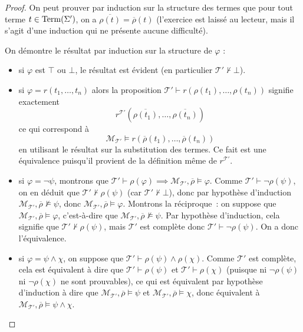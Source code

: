 \begin{proof}
  On peut prouver par induction sur la structure des termes que pour tout terme
  $t \in \operatorname{Term}(\Sigma')$, on a $\overline{\rho(t)} = \overline \rho(t)$
  (l'exercice est laissé au lecteur, mais il s'agit d'une induction qui ne
  présente aucune difficulté).
  
  On démontre le résultat par induction sur la structure de $\varphi$ :
  \begin{itemize}
  \item si $\varphi$ est $\top$ ou $\bot$, le résultat est évident (en
    particulier $\mathcal T'\nvdash\bot$).
  \item si $\varphi = r(t_1,\ldots,t_n)$ alors la proposition
    $\mathcal T'\vdash r(\rho(t_1),\ldots,\rho(t_n))$ signifie exactement
    \[r^{\mathcal T'}(\overline{\rho(t_1)},\ldots,\overline{\rho(t_n)})\]
    ce qui correspond à
    \[\mathcal M_{\mathcal T'}\models 
    r(\overline \rho (t_1),\ldots,\overline \rho(t_n))\]
    en utilisant le résultat sur la substitution des termes.
    Ce fait est une équivalence puisqu'il provient de la définition même de
    $r^{\mathcal T'}$.
  \item si $\varphi = \lnot \psi$, montrons que
    $\mathcal T'\vdash\rho(\varphi)\implies \mathcal M_{\mathcal T'},
    \overline\rho \models \varphi$.
    Comme $\mathcal T'\vdash \lnot \rho(\psi)$, on en déduit que
    $\mathcal T'\nvdash \rho(\psi)$ (car $\mathcal T'\nvdash\bot$), donc par
    hypothèse d'induction
    $\mathcal M_{\mathcal T'},\overline \rho\not\models \psi$, donc
    $\mathcal M_{\mathcal T'},\overline \rho\models \varphi$.
    Montrons la réciproque~: on suppose que
    $\mathcal M_{\mathcal T'},\overline\rho\models \varphi$, c'est-à-dire que
    $\mathcal M_{\mathcal T'},\overline\rho\not\models \psi$. Par hypothèse
    d'induction, cela signifie que $\mathcal T'\nvdash \rho(\psi)$, mais
    $\mathcal T'$ est complète donc $\mathcal T'\vdash\lnot\rho(\psi)$. On a
    donc l'équivalence.
  \item si $\varphi = \psi \land \chi$, on suppose que
    $\mathcal T'\vdash \rho(\psi)\land\rho(\chi)$. Comme $\mathcal T'$ est
    complète, cela est équivalent à dire que $\mathcal T'\vdash \rho(\psi)$ et
    $\mathcal T'\vdash \rho(\chi)$ (puisque ni $\lnot\rho(\psi)$ ni
    $\lnot \rho(\chi)$ ne sont prouvables), ce qui est équivalent par hypothèse
    d'induction à dire que
    $\mathcal M_{\mathcal T'},\overline\rho\models\psi$ et
    $\mathcal M_{\mathcal T'},\overline\rho\models\chi$, donc équivalent à
    $\mathcal M_{\mathcal T'},\overline\rho\models \psi\land \chi$.

\end{itemize}
\end{proof}
